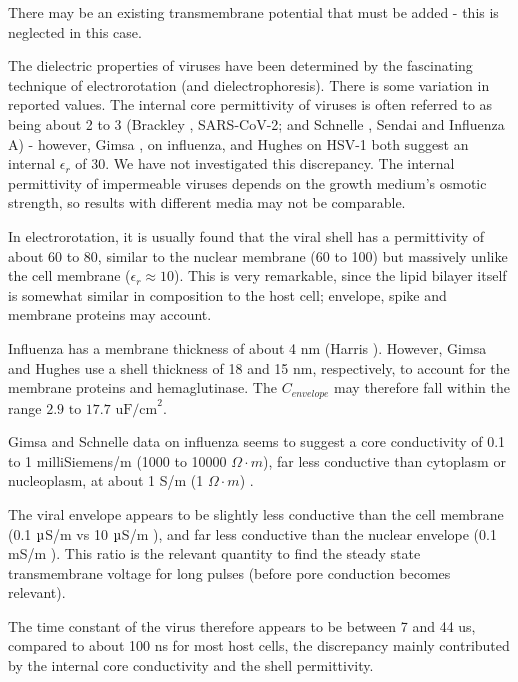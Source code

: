 \documentclass[fleqn,10pt]{article}
\begin{document}
There may be an existing transmembrane potential that must be added - this is neglected in this case.

The dielectric properties of viruses have been determined by the fascinating technique of electrorotation (and dielectrophoresis). There is some variation in reported values. The internal core permittivity of viruses is often referred to as being about 2 to 3 (Brackley \cite{Electrostatic2020}, SARS-CoV-2; and Schnelle \cite{Trapping1996}, Sendai and Influenza A) - however, Gimsa \cite{New1999}, on influenza, and Hughes\cite{Dielectrophoretic2001} on HSV-1 both suggest an internal $\epsilon_r$ of 30. We have not investigated this discrepancy. The internal permittivity of impermeable viruses depends on the growth medium's osmotic strength\cite{Osmotic2003}, so results with different media may not be comparable.

In electrorotation, it is usually found that the viral shell has a permittivity of about 60 to 80, similar to the nuclear membrane (60 to 100) but massively unlike the cell membrane ($\epsilon_r\approx 10$). This is very remarkable, since the lipid bilayer itself is somewhat similar in composition to the host cell; envelope, spike and membrane proteins may account.

Influenza has a membrane thickness of about 4 nm (Harris \cite{Influenza2006}). However, Gimsa and Hughes use a shell thickness of 18 and 15 nm, respectively, to account for the membrane proteins and hemaglutinase. The $C_{envelope}$ may therefore fall within the range $2.9 \text{ to } 17.7 \text{ uF/cm}^2$.


Gimsa and Schnelle data on influenza seems to suggest a core conductivity of 0.1 to 1 milliSiemens/m (1000 to 10000 $\Omega \cdot m$), far less conductive than cytoplasm or nucleoplasm, at about 1 S/m (1 $\Omega \cdot m$) \cite{Study2001}.

The viral envelope appears to be slightly less conductive than the cell membrane (0.1 $\micro$S/m \cite{New1999} vs 10 $\micro$S/m \cite{Study2001}), and far less conductive than the nuclear envelope (0.1 $\text{m}$S/m \cite{Study2001}). This ratio is the relevant quantity to find the steady state transmembrane voltage for long pulses (before pore conduction becomes relevant).

The time constant of the virus therefore appears to be between 7 and 44 us, compared to about 100 ns for most host cells, the discrepancy mainly contributed by the internal core conductivity and the shell permittivity.
\end{document}
